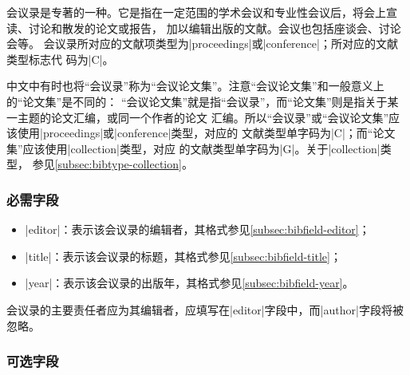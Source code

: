 会议录是专著的一种。它是指在一定范围的学术会议和专业性会议后，将会上宣读、讨论和散发的论文或报告，
加以编辑出版的文献\cite{hudong2013huiyilu}。会议也包括座谈会、讨论会等\cite{gbt7714-2005}。
会议录所对应的{\BibTeX}文献项类型为|proceedings|或|conference|；所对应的文献类型标志代
码为|C|\cite{gbt7714-2005}。

\begin{note}
中文中有时也将“会议录”称为“会议论文集”。注意“会议论文集”和一般意义上的“论文集”是不同的：
“会议论文集”就是指“会议录”，而“论文集”则是指关于某一主题的论文汇编，或同一个作者的论文
汇编。所以“会议录”或“会议论文集”应该使用|proceedings|或|conference|类型，对应的
文献类型单字码为|C|；而“论文集”应该使用|collection|类型，对应
的文献类型单字码为|G|。关于|collection|类型，
参见\ref{subsec:bibtype-collection}。
\end{note}

\subsubsection{必需字段}

\begin{itemize}
\item |editor|：表示该会议录的编辑者，其格式参见\ref{subsec:bibfield-editor}；
\item |title|：表示该会议录的标题，其格式参见\ref{subsec:bibfield-title}；
\item |year|：表示该会议录的出版年，其格式参见\ref{subsec:bibfield-year}。
\end{itemize}

\begin{note}
会议录的主要责任者应为其编辑者，应填写在|editor|字段中，而|author|字段将被忽略。
\end{note}

\subsubsection{可选字段}

